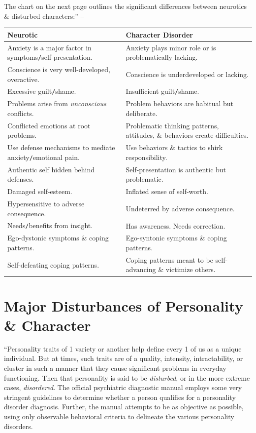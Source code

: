 \documentclass{article}
\numberwithin{equation}{section}
\begin{document}
The chart on the next page outlines the significant differences between neurotics \& disturbed characters:'' -- \cite[pp. 27--53]{Simon2011}
\begin{table}[H]
	\centering
	\begin{tabular}{|p{}|p{}|}
		\hline
		\textbf{Neurotic} & \textbf{Character Disorder} \\
		\hline
		Anxiety is a major factor in symptoms\texttt{/}self-presentation. & Anxiety plays minor role or is problematically lacking. \\
		\hline
		Conscience is very well-developed, overactive. & Conscience is underdeveloped or lacking. \\
		\hline
		Excessive guilt\texttt{/}shame. & Insufficient guilt\texttt{/}shame. \\
		\hline
		Problems arise from \textit{unconscious} conflicts. & Problem behaviors are habitual but deliberate. \\
		\hline
		Conflicted emotions at root problems. & Problematic thinking patterns, attitudes, \& behaviors create difficulties. \\
		\hline
		Use defense mechanisms to mediate anxiety\texttt{/}emotional pain. & Use behaviors \& tactics to shirk responsibility. \\
		\hline
		Authentic self hidden behind defenses. & Self-presentation is authentic but problematic. \\
		\hline
		Damaged self-esteem. & Inflated sense of self-worth. \\
		\hline
		Hypersensitive to adverse consequence. & Undeterred by adverse consequence. \\
		\hline
		Needs\texttt{/}benefits from insight. & Has awareness. Needs correction. \\
		\hline
		Ego-dystonic symptoms \& coping patterns. & Ego-syntonic symptoms \& coping patterns. \\
		\hline
		Self-defeating coping patterns. & Coping patterns meant to be self-advancing \& victimize others. \\
		\hline
	\end{tabular}
\end{table}


\section{Major Disturbances of Personality \& Character}
``Personality traits of 1 variety or another help define every 1 of us as a unique individual. But at times, such traits are of a quality, intensity, intractability, or cluster in such a manner that they cause significant problems in everyday functioning. Then that personality is said to be \textit{disturbed}, or in the more extreme cases, \textit{disordered}. The official psychiatric diagnostic manual employs some very stringent guidelines to determine whether a person qualifies for a personality disorder diagnosis. Further, the manual attempts to be as objective as possible, using only observable behavioral criteria to delineate the various personality disorders.
\end{document}
